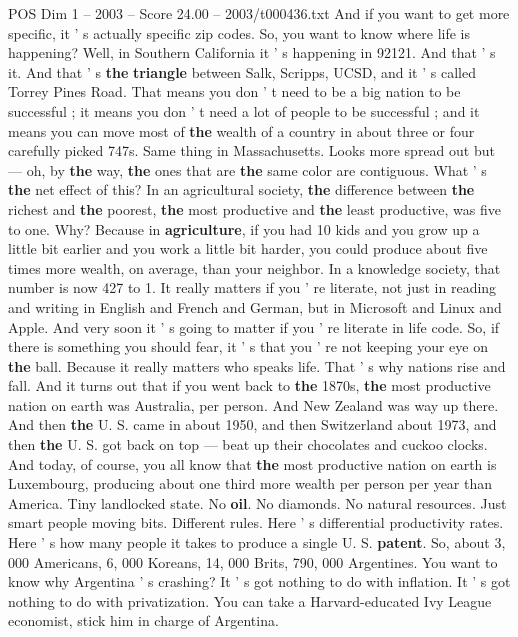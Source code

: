 \begin{textsample}{POS Dim 1 – 2003 – Score 24.00 – 2003/t000436.txt}
And if you want to get more specific, it ' s actually specific zip codes.
So, you want to know where life is happening?
Well, in Southern California it ' s happening in 92121.
And that ' s it.
And that ' s \textbf{the} \textbf{triangle} between Salk, Scripps, UCSD, and it ' s called Torrey Pines Road.
That means you don ' t need to be a big nation to be successful ; it means you don ' t need a lot of people to be successful ; and it means you can move most of \textbf{the} wealth of a country in about three or four carefully picked 747s.
Same thing in Massachusetts.
Looks more spread out but — oh, by \textbf{the} way, \textbf{the} ones that are \textbf{the} same color are contiguous.
What ' s \textbf{the} net effect of this?
In an agricultural society, \textbf{the} difference between \textbf{the} richest and \textbf{the} poorest, \textbf{the} most productive and \textbf{the} least productive, was five to one.
Why?
Because in \textbf{agriculture}, if you had 10 kids and you grow up a little bit earlier and you work a little bit harder, you could produce about five times more wealth, on average, than your neighbor.
In a knowledge society, that number is now 427 to 1.
It really matters if you ' re literate, not just in reading and writing in English and French and German, but in Microsoft and Linux and Apple.
And very soon it ' s going to matter if you ' re literate in life code.
So, if there is something you should fear, it ' s that you ' re not keeping your eye on \textbf{the} ball.
Because it really matters who speaks life.
That ' s why nations rise and fall.
And it turns out that if you went back to \textbf{the} 1870s, \textbf{the} most productive nation on earth was Australia, per person.
And New Zealand was way up there.
And then \textbf{the} U.
S. came in about 1950, and then Switzerland about 1973, and then \textbf{the} U.
S. got back on top — beat up their chocolates and cuckoo clocks.
And today, of course, you all know that \textbf{the} most productive nation on earth is Luxembourg, producing about one third more wealth per person per year than America.
Tiny landlocked state.
No \textbf{oil}.
No diamonds.
No natural resources.
Just smart people moving bits.
Different rules.
Here ' s differential productivity rates.
Here ' s how many people it takes to produce a single U.
S. \textbf{patent}.
So, about 3, 000 Americans, 6, 000 Koreans, 14, 000 Brits, 790, 000 Argentines.
You want to know why Argentina ' s crashing?
It ' s got nothing to do with inflation.
It ' s got nothing to do with privatization.
You can take a Harvard-educated Ivy League economist, stick him in charge of Argentina.

\end{textsample}
